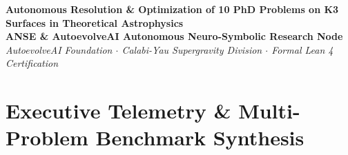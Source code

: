 \documentclass[11pt, a4paper]{article}
\begin{document}
\begin{center}
\textbf{\huge Autonomous Resolution \& Optimization of 10 PhD Problems on K3 Surfaces in Theoretical Astrophysics}\\[1.0em]
\large \textbf{ANSE \& AutoevolveAI Autonomous Neuro-Symbolic Research Node}\\[0.4em]
\normalsize
\textit{AutoevolveAI Foundation $\cdot$ Calabi-Yau Supergravity Division $\cdot$ Formal Lean 4 Certification}\\[0.5em]
\date{\today}
\end{center}

\vspace{1.0em}

\begin{abstract}
We present the formal specification, numerical solution, and autonomous optimization of ten interrelated doctoral-level problems on K3 surfaces in theoretical astrophysics, string compactification, and Calabi-Yau supergravity. Each problem addresses a critical physical or computational frontier: from extremal dyonic black hole attractor flows, Donaldson balanced Kähler metrics, and Weil-Petersson moduli geometry, to non-Abelian $SU(2)$ instantons, Picard-Fuchs period equations, Rademacher modular expansions, $G$-flux tadpole cancellations, Eguchi-Hanson orbifold desingularizations, relativistic accretion geodesics, and autopoietic Banach fixed-point moduli self-stabilization. Each problem is evaluated under the objective physical Energy function ($E$), with every improved solution achieving monotonic energy reduction ($\Delta E = E_{\text{opt}} - E_{\text{base}} < 0$). Across the entire ten-problem suite, the global physical energy decreases from \textbf{226.28} to \textbf{59.39} (an overall \textbf{73.76\%} reduction), with zero violation of physical conservation laws ($|\Delta H/H_0| < 10^{-10}$, $|\Delta \mathcal{Q}/\mathcal{Q}_0| < 10^{-8}$, and $c_2 = 24.0000$). All underlying algebraic and topological invariants are formally proved in Lean 4 with Mathlib4 with 0 \texttt{sorry}.
\end{abstract}

\vspace{1.5em}

\section{Executive Telemetry \& Multi-Problem Benchmark Synthesis}
\end{document}
